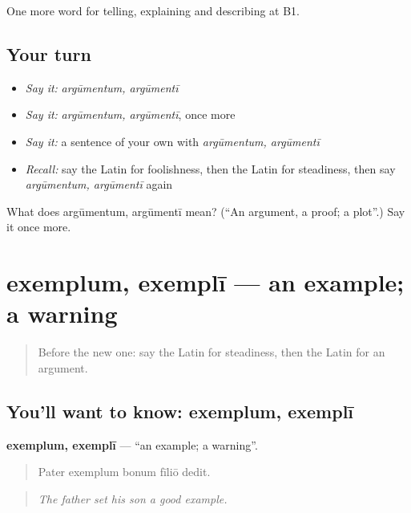 \begin{grammarlens}[title={What you've built}]
One more word for telling, explaining and describing at B1.
\end{grammarlens}

\subsection*{Your turn}
\begin{itemize}
\raggedright
  \item \emph{Say it:} \emph{argūmentum, argūmentī}
  \item \emph{Say it:} \emph{argūmentum, argūmentī}, once more
  \item \emph{Say it:} a sentence of your own with \emph{argūmentum, argūmentī}
  \item \emph{Recall:} say the Latin for foolishness, then the Latin for steadiness, then say \emph{argūmentum, argūmentī} again
\end{itemize}

\begin{tcolorbox}[breakable,colback=teal!4,colframe=teal!35!black,title={Before you move on}]
What does argūmentum, argūmentī mean? (\textquotedblleft{}An argument, a proof; a plot\textquotedblright{}.) Say it once more.
\end{tcolorbox}
\section[exemplum, exemplī]{exemplum, exemplī — an example; a warning}

\label{lesson:LA-C361-exemplum}



\begin{quote}
Before the new one: say the Latin for steadiness, then the Latin for an argument.
\end{quote}

\subsection*{You'll want to know: exemplum, exemplī}
\textbf{exemplum, exemplī} — \textquotedblleft{}an example; a warning\textquotedblright{}.

\begin{quote}
Pater exemplum bonum fīliō dedit.
\end{quote}

\begin{quote}
\emph{The father set his son a good example.}
\end{quote}

